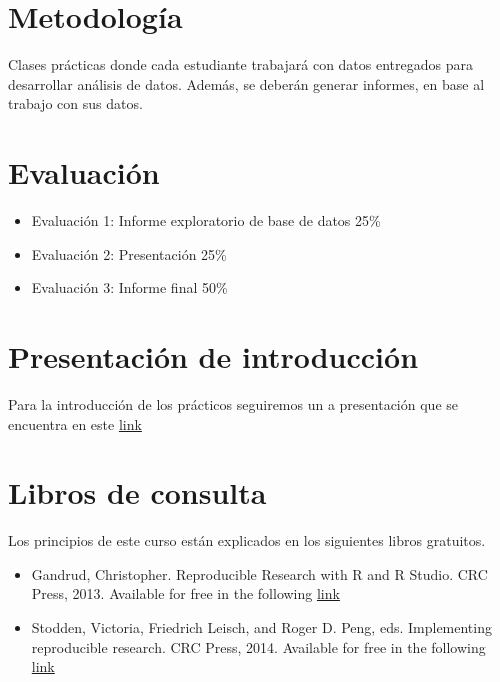 \documentclass[]{book}
\providecommand{\tightlist}{%
  \setlength{\itemsep}{0pt}\setlength{\parskip}{0pt}}
\begin{document}
\hypertarget{metodologia}{%
\section{Metodología}\label{metodologia}}

Clases prácticas donde cada estudiante trabajará con datos entregados para desarrollar análisis de datos. Además, se deberán generar informes, en base al trabajo con sus datos.

\hypertarget{evaluacion}{%
\section{Evaluación}\label{evaluacion}}

\begin{itemize}
\tightlist
\item
  Evaluación 1: Informe exploratorio de base de datos 25\%
\item
  Evaluación 2: Presentación 25\%
\item
  Evaluación 3: Informe final 50\%
\end{itemize}

\hypertarget{presentacion-de-introduccion}{%
\section{Presentación de introducción}\label{presentacion-de-introduccion}}

Para la introducción de los prácticos seguiremos un a presentación que se encuentra en este \href{http://www.derek-corcoran-barrios.com/AyudantiaStatsPres/Clase1/Clase1.html}{link}

\hypertarget{libros-de-consulta}{%
\section{Libros de consulta}\label{libros-de-consulta}}

Los principios de este curso están explicados en los siguientes libros gratuitos.

\begin{itemize}
\tightlist
\item
  Gandrud, Christopher. Reproducible Research with R and R Studio. CRC Press, 2013. Available for free in the following
  \href{https://englianhu.files.wordpress.com/2016/01/reproducible-research-with-r-and-studio-2nd-edition.pdf}{link}
\item
  Stodden, Victoria, Friedrich Leisch, and Roger D. Peng, eds. Implementing reproducible research. CRC Press, 2014. Available for free in the following \href{http://web.stanford.edu/~vcs/papers/ijclp-STODDEN-2009.pdf}{link}
\end{itemize}
\end{document}
